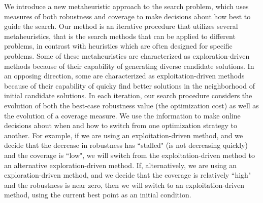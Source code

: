 We introduce a new metaheuristic approach to the search
problem, which uses measures of both robustness and coverage to make
decisions about how best to guide the search.  Our method is an
iterative procedure that utilizes several metaheuristics, that is the
search methods that can be applied to different problems, in contrast
with heuristics which are often designed for specific problems. Some
of these metaheuristics are characterized as exploration-driven
methods because of their capability of generating diverse candidate
solutions. In an opposing direction, some are characterized as
exploitation-driven methods because of their capability of quicky find
better solutions in the neighborhood of initial candidate solutions.
In each iteration, our search procedure considers the evolution of
both the best-case robustness value (the optimization cost) as well as
the evolution of a coverage measure.  We use the information to make
online decisions about when and how to switch from one optimization
strategy to another.  For example, if we are using an
exploitation-driven method, and we decide that the decrease in
robustness has ``stalled" (is not decreasing quickly) and the coverage
is ``low", we will switch from the exploitation-driven method to an
alternative exploration-driven method.  If, alternatively, we are
using an exploration-driven method, and we decide that the coverage is
relatively ``high" and the robustness is near zero, then we will
switch to an exploitation-driven method, using the current best point
as an initial condition.
 



